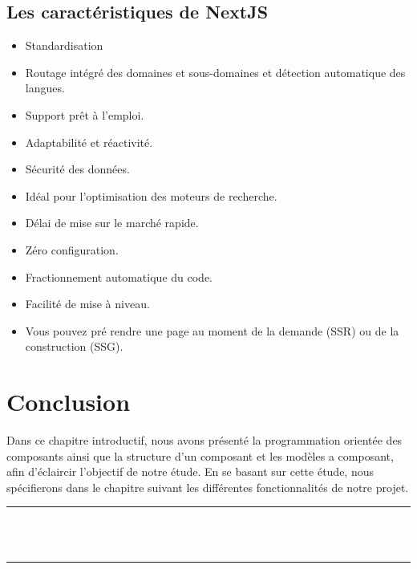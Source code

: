 \documentclass[12pt]{report}
\begin{document}
\newpage

\vspace*{0.1in}

\subsection{Les caractéristiques de NextJS}
\vspace{0.1in}

\begin{itemize}
    \item Standardisation
    \item Routage intégré des domaines et sous-domaines et détection automatique des langues.
    \item Support prêt à l’emploi.
    \item Adaptabilité et réactivité.
    \item Sécurité des données.
    \item Idéal pour l’optimisation des moteurs de recherche.
    \item Délai de mise sur le marché rapide.
    \item Zéro configuration.
    \item Fractionnement automatique du code.
    \item Facilité de mise à niveau.
    \item Vous pouvez pré rendre une page au moment de la demande (SSR) ou de la construction (SSG).
\end{itemize}

\section{Conclusion}
\vspace{0.1in}
\hspace*{0.16in}
Dans ce chapitre introductif, nous avons présenté la programmation orientée des composants ainsi que la structure d’un composant et les modèles a composant, afin d’éclaircir l’objectif de notre étude. En se basant sur cette étude, nous spécifierons dans le chapitre suivant les différentes fonctionnalités de notre projet.

\newpage

\vspace*{\fill}
\begin{center}
    {\color{Black} \rule{\linewidth}{1.2mm} }\\
\vspace{0.25in}
    {\centering{}}
\vspace{0.35in}\\
    {\color{Black} \rule{\linewidth}{1.2mm} }
\end{center}
\vspace*{\fill}
\setcounter{section}{0}
\end{document}
